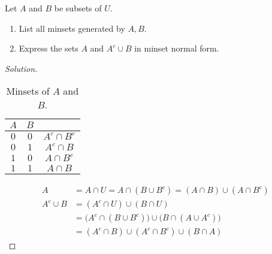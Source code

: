 \documentclass[../main.tex]{subfiles}
\begin{document}
\begin{problem}
Let $A$ and $B$ be subsets of $U$. 
\begin{enumerate}
\item List all minsets generated by $A, B$.
\item Express the sets $A$ and $A^c\cup B$ in minset normal form.
\end{enumerate}
\end{problem}
\begin{proof}[Solution]
%
\begin{table}[H]
    \centering
    \begin{tabular}{c c c}
        \hline
        $A$ & $B$ & \\ [0.5ex]
        \hline
        $0$ & $0$ & $A^c \cap B^c$\\
        $0$ & $1$ & $A^c \cap B$\\
        $1$ & $0$ & $A\cap B^c$\\
        $1$ & $1$ & $A\cap B$\\
        \hline
    \end{tabular}
    \caption{Minsets of $A$ and $B$.}
    \label{tab:discrete_structures_exam_II_problem_blah}
\end{table}
%
\begin{align*}
    A &= A\cap U = A\cap(B\cup B^c) = (A\cap B)\cup(A\cap B^c)\\
    A^c \cup B &= (A^c \cap U)\cup (B\cap U)\\
    &= \big(A^c\cap (B\cup B^c)\big)\cup\big(B\cap (A\cup A^c)\big)\\
    &= (A^c\cap B)\cup(A^c\cap B^c)\cup (B\cap A)
\end{align*}
\end{proof}
\end{document}
